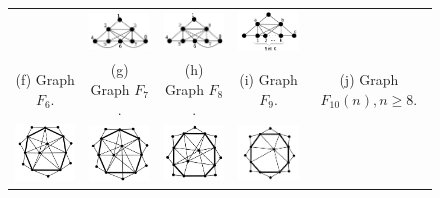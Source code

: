 \begin{figure}[htb]
\begin{tabular}{  c c c c  c}
    & 
    \includegraphics[width=3cm]{img/f8.png} 
    & 
    \includegraphics[width=3cm]{img/f9.png} 
    & 
    \includegraphics[width=3cm]{img/f10n.png} 
    \\ %
    \footnotesize 
    (f)  \footnotesize Graph $F_6$. 
    & 
    \footnotesize (g) Graph $F_7$.
    & 
    \footnotesize (h) Graph $F_8$.
    & 
    \footnotesize (i) Graph $F_9$.
    & 
    \footnotesize (j) Graph $F_{10}(n), n\geq  8$.
    \\%
        \includegraphics[width=3cm]{img/f11.png} 
    & 
    \includegraphics[width=3cm]{img/f12.png} 
    & 
    \includegraphics[width=3cm]{img/f13.png} 
    & 
    \includegraphics[width=3cm]{img/f14.png} 

\end{tabular}
\end{figure}
